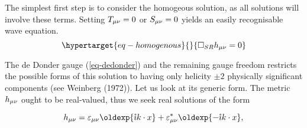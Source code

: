 \documentclass[
  letterpaper,
  DIV=11,
  numbers=noendperiod,
  oneside]{scrreprt}
\begin{document}
The simplest first step is to consider the homogeous solution, as all
solutions will involve these terms. Setting
\(\texttip{\texttip{T}{Stress-Energy tensor, or energy-momentum tensor}_{{\mu\nu}}}{covariant Stress-Energy tensor component}=0\)
or
\(\texttip{\texttip{S}{source tensor}_{\mu\nu}}{covariant source tensor component}=0\)
yields an easily recognisable wave equation.
\begin{equation}\protect\hypertarget{eq-homogenous}{}{
   \mathtip{\Box_{SR}}{\texttip{\texttip{\eta}{Minkoski metric tensor +---}^{{\mu\nu}}}{contravariant Minkoski metric components +---}\partial_\mu\partial_\nu}\texttip{\texttip{h}{weak metric tensor}_{{\mu\nu}}}{weak covariant metric tensor component}= 0 
}\label{eq-homogenous}\end{equation}

The de Donder gauge (\ref{eq-dedonder}) and the remaining gauge
freedom
restricts the possible forms of this solution to having only helicity
\(\pm2\) physically significant components (see Weinberg
(1972)).
Let us look at its generic form. The metric
\(\texttip{\texttip{h}{weak metric tensor}_{{\mu\nu}}}{weak covariant metric tensor component}\)
ought to be real-valued, thus we seek real solutions of the form

\[
    \texttip{\texttip{h}{weak metric tensor}_{{\mu\nu}}}{weak covariant metric tensor component}= \texttip{\texttip{\varepsilon}{Polarization tensor}_{{\mu\nu}}}{covariant Polarization tensor component}\oldexp{\mathtip{{\mathring{\imath}}}{\text{Complex unit: } {\mathring{\imath}}^2 = -1}k\cdot x} + \texttip{\texttip{\varepsilon^\ast}{Conjugate Polarization tensor}_{{\mu\nu}}}{covariant conjugate Polarization tensor component}\oldexp{-\mathtip{{\mathring{\imath}}}{\text{Complex unit: } {\mathring{\imath}}^2 = -1}k\cdot x},
\]
\end{document}
